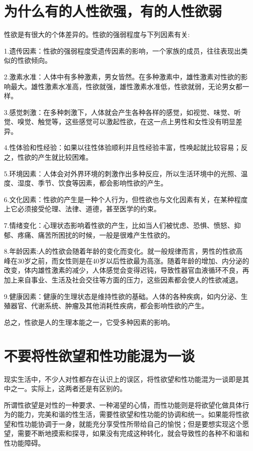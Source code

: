 \documentclass[12pt,UTF8]{ctexbook}
\begin{document}
\chapter{为什么有的人性欲强，有的人性欲弱}

性欲是有很大的个体差异的。性欲的强弱程度与下列因素有关:

1.遗传因素：性欲的强弱程度受遗传因素的影响，一个家族的成员，往往表现出类似的性欲倾向。

2.激素水准：人体中有多种激素，男女皆然。在多种激素中，雄性激素对性欲的影响最大。雄性激素水准高，性欲就强，雄性激素水准低，性欲就弱，无论男女都一样。

3.感觉刺激：在多种刺激下，人体就会产生各种各样的感觉，如视觉、味觉、听觉、嗅觉、触觉等，这些感觉可以激起性欲，在这一点上男性和女性没有明显差异。

4.性体验和性经验：如果以往性体验顺利并且性经验丰富，性唤起就比较容易；反之，性欲的产生就比较困难。

5.环境因素：人体会对外界环境的刺激作出多种反应，所以生活环境中的光照、温度、湿度、季节、饮食等因素，都会影响性欲的产生。

6.文化因素：性欲的产生是一种个人行为，但性欲也与文化因素有关，在某种程度上它必须接受伦理、法律、道德，甚至医学的约束。

7.情绪变化：心理状态影响着性欲的产生，比如当人们被忧虑、恐惧、愤怒、抑郁、疼痛、痛苦所困扰的时候，一般是很难产生性欲的。

8.年龄因素:人的性欲会随着年龄的变化而变化。就一般规律而言，男性的性欲高峰在30岁之前，而女性则是在40岁以后性欲最为高涨。随着年龄的增加、内分泌的改变，体内雄性激素的减少，人体感觉会变得迟钝，导致性器官血液循环不良，再加上来自事业、生活及社会交往等方面的压力，这些因素都会使人的性欲减退。

9.健康因素：健康的生理状态是维持性欲的基础。人体的各种疾病，如内分泌、生殖器官、代谢系统、肿瘤及其他消耗性疾病，都会影响性欲的产生。

总之，性欲是人的生理本能之一，它受多种因素的影响。

\chapter{不要将性欲望和性功能混为一谈}

现实生活中，不少人对性都存在认识上的误区，将性欲望和性功能混为一谈即是其中之一。实际上，这两者还是有区别的。

所谓性欲望是对性的一种要求、一种渴望的心情，而性功能则是将欲望化做具体行为的能力，完美和谐的性生活，需要性欲望和性功能的协调和统一。如果能将性欲望和性功能协调于一身，就能充分享受性所带给自己的愉悦；但是要想实现这个愿望，需要不断地摸索和探寻，如果没有完成这种转化，就会导致性的各种不和谐和性功能障碍。
\end{document}
